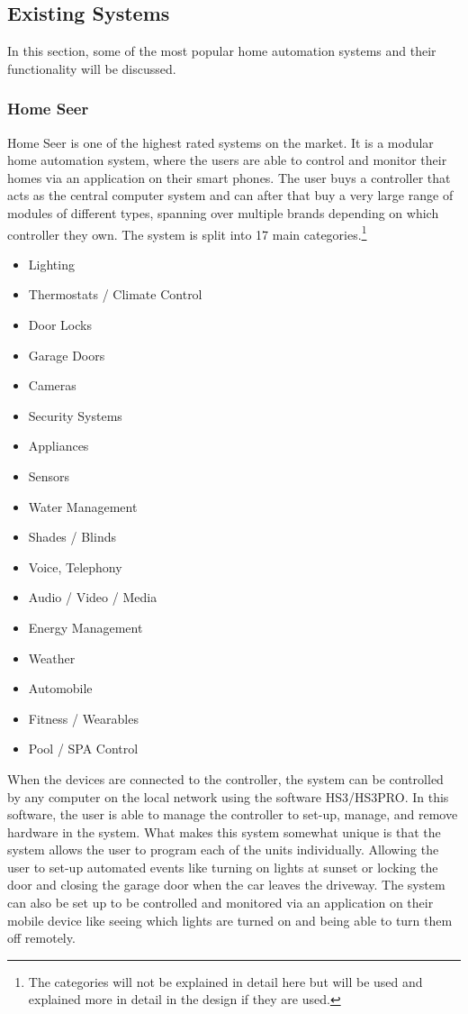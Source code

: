 \subsection{Existing Systems}
In this section, some of the most popular home automation systems and their functionality will be discussed.

\subsubsection{Home Seer}
Home Seer is one of the highest rated systems on the market. It is a modular home automation system, where the users are able to control and monitor their homes via an application on their smart phones. The user buys a controller that acts as the central computer system and can after that buy a very large range of modules of different types, spanning over multiple brands depending on which controller they own. The system is split into 17 main categories.\footnote{The categories will not be explained in detail here but will be used and explained more in detail in the design if they are used.}
\begin{itemize}
	\item Lighting
	\item Thermostats / Climate Control
	\item Door Locks
	\item Garage Doors
	\item Cameras
	\item Security Systems
	\item Appliances
	\item Sensors
	\item Water Management
	\item Shades / Blinds
	\item Voice, Telephony
	\item Audio / Video / Media
	\item Energy Management
	\item Weather
	\item Automobile
	\item Fitness / Wearables
	\item Pool / SPA Control
\end{itemize}%
When the devices are connected to the controller, the system can be controlled by any computer on the local network using the software HS3/HS3PRO. In this software, the user is able to manage the controller to set-up, manage, and remove hardware in the system. What makes this system somewhat unique is that the system allows the user to program each of the units individually. Allowing the user to set-up automated events like turning on lights at sunset or locking the door and closing the garage door when the car leaves the driveway. The system can also be set up to be controlled and monitored via an application on their mobile device like seeing which lights are turned on and being able to turn them off remotely.%

